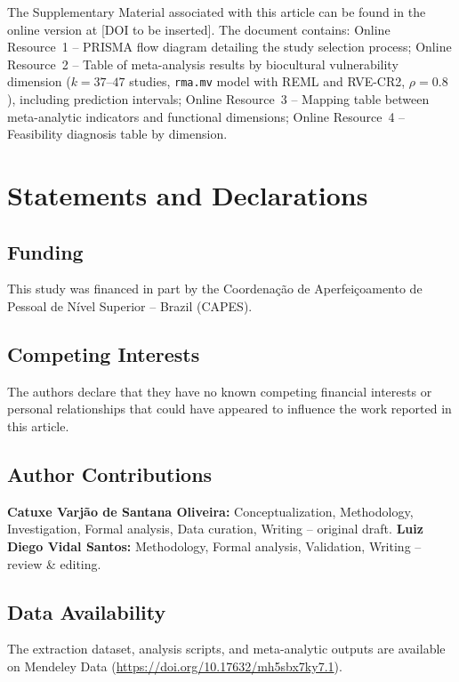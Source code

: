 \documentclass[12pt,a4paper]{article}
\begin{document}
The Supplementary Material associated with this article can be found in the online version at [DOI to be inserted]. The document contains: Online Resource~1 -- PRISMA flow diagram detailing the study selection process; Online Resource~2 -- Table of meta-analysis results by biocultural vulnerability dimension ($k = 37$--$47$ studies, \texttt{rma.mv} model with REML and RVE-CR2, $\rho = 0.8$), including prediction intervals; Online Resource~3 -- Mapping table between meta-analytic indicators and functional dimensions; Online Resource~4 -- Feasibility diagnosis table by dimension.




\section*{Statements and Declarations}

\subsection*{Funding}

This study was financed in part by the Coordena\c{c}\~ao de Aperfei\c{c}oamento de Pessoal de N\'ivel Superior -- Brazil (CAPES).

\subsection*{Competing Interests}

The authors declare that they have no known competing financial interests or personal relationships that could have appeared to influence the work reported in this article.

\subsection*{Author Contributions}

\textbf{Catuxe Varj\~ao de Santana Oliveira:} Conceptualization, Methodology, Investigation, Formal analysis, Data curation, Writing -- original draft. \textbf{Luiz Diego Vidal Santos:} Methodology, Formal analysis, Validation, Writing -- review \& editing.

\subsection*{Data Availability}

The extraction dataset, analysis scripts, and meta-analytic outputs are available on Mendeley Data (\url{https://doi.org/10.17632/mh5sbx7ky7.1}).
\end{document}
